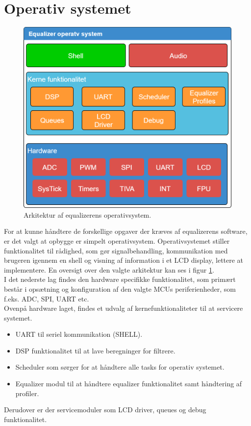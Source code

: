 \section{Operativ systemet}

\begin{figure}[h!]
	\centering
	\includegraphics[width=.5\textwidth]{billeder/eq_os.png}
	\caption{Arkitektur af equalizerens operativsystem.}
	\label{fig:eq_os}
\end{figure}

For at kunne håndtere de forskellige opgaver der kræves af equalizerens software, er det valgt at opbygge er simpelt operativsystem.
Operativsystemet stiller funktionalitet til rådighed, som gør signalbehandling, kommunikation med brugeren igennem en shell og visning af information i et LCD display, lettere at implementere. En oversigt over den valgte arkitektur kan ses i figur \ref{fig:eq_os}.\\

I det nederste lag findes den hardware specifikke funktionalitet, som primært består i opsætning og konfiguration af den valgte MCUs periferienheder, som f.eks. ADC, SPI, UART etc.\\
 
Ovenpå hardware laget, findes et udvalg af kernefunktionaliteter til at servicere systemet.
\begin{itemize}[noitemsep]
	\item UART til seriel kommunikation (SHELL).
	\item DSP funktionalitet til at lave beregninger for filtrere.
	\item Scheduler som sørger for at håndtere alle tasks for operativ systemet.
	\item Equalizer modul til at håndtere equalizer funktionalitet samt håndtering af profiler. 
\end{itemize}

Derudover er der servicemoduler som LCD driver, queues og debug funktionalitet.\\

